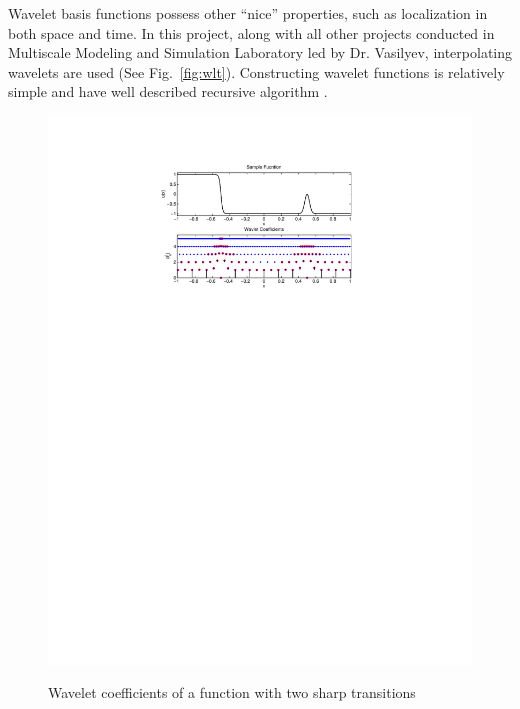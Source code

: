 Wavelet basis functions possess other ``nice'' properties, such as localization in both space and time. In this project, along with all other projects conducted in Multiscale Modeling and Simulation Laboratory led by Dr. Vasilyev, interpolating wavelets are used (See Fig.~\ref{fig:wlt}). Constructing wavelet functions is relatively simple and have well described recursive algorithm \cite{lib:wlt_home}.

\begin{figure}[h!]
\centering \includegraphics[scale=1]{fig/wlt_decomp.pdf}\\
\caption{Wavelet coefficients of a function with two sharp transitions \label{fig:wlt_decomp}}
\end{figure}
